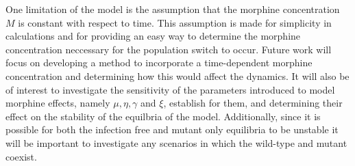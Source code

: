 \documentclass[11pt, oneside]{article}    %
\begin{document}
	One limitation of the model is the assumption that the morphine concentration $M$ is constant with respect to time. This assumption is made for simplicity in calculations and for providing an easy way to determine the morphine concentration neccessary for the population switch to occur. Future work will focus on developing a method to incorporate a time-dependent morphine concentration and determining how this would affect the dynamics. It will also be of interest to investigate the sensitivity of the parameters introduced to model morphine effects, namely $\mu, \eta,\gamma$ and $\xi$, establish for them, and determining their effect on the stability of the equilbria of the model. Additionally, since it is possible for both the infection free and mutant only equilibria to be unstable it will be important to investigate any scenarios in which the wild-type and mutant coexist.  
\end{document}
